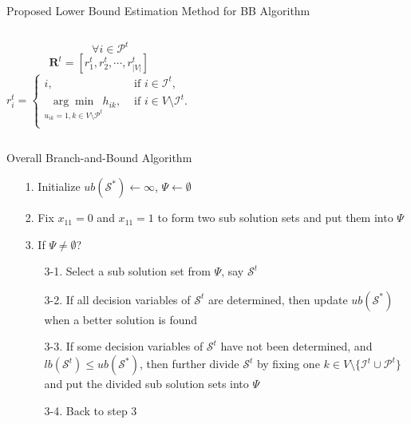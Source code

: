 \begin{frame}{Proposed Lower Bound Estimation Method for BB Algorithm}
\begin{columns}
{\begin{equation*}
\quad \quad \forall i \in \mathcal{P}^t
\label{eq::infColumn}
\end{equation*}
}
%
{\tiny
\begin{equation*}
\mathbf{R}^t = [r_1^t,r_2^t,\cdots,r_{|V|}^t]
\end{equation*}
}
%
{\tiny
\begin{equation*}
r_i^t = 
\left\{ \begin{array}{cc}
i,  &\text{ if $i \in \mathcal{I}^t$,} \\                  	   
\underset{u_{ik}=1, k \in V \setminus \mathcal{P}^t}{\arg\min} h_{ik},  &\text{ if $i \in V\setminus \mathcal{I}^t$.} \\
\end{array} \right.
\label{eq::initRefStructure}
\end{equation*}
}
\end{columns}
\end{frame}
\begin{frame}{Overall Branch-and-Bound Algorithm}
\begin{itemize}
	\item[1.] Initialize $ub(\mathcal{S}^*) \gets \infty$, $\Psi \gets \emptyset$
	\item[2.] Fix $x_{11} = 0$ and $x_{11} = 1$ to form two sub solution sets and put them into $\Psi$
	\item[3.] If $\Psi \neq \emptyset$?
	\begin{itemize}
		\item[3-1.] Select a sub solution set from $\Psi$, say $\mathcal{S}^t$
		\item[3-2.] If all decision variables of $\mathcal{S}^t$ are determined, then update $ub(\mathcal{S}^*)$ when a better solution is found
		\item[3-3.] If some decision variables of $\mathcal{S}^t$ have not been determined, and $lb(\mathcal{S}^t) \leq ub(\mathcal{S}^*)$, then further divide $\mathcal{S}^t$ by fixing one $k \in V \setminus \{\mathcal{I}^t \cup \mathcal{P}^t\}$ and put the divided sub solution sets into $\Psi$
		\item[3-4.] Back to step 3
	\end{itemize}
\end{itemize}
\end{frame}